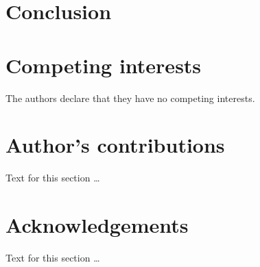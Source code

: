 \documentclass{bmcart}
\begin{document}

\section*{Conclusion}


\begin{backmatter}

\section*{Competing interests}
  The authors declare that they have no competing interests.

\section*{Author's contributions}
    Text for this section \ldots

\section*{Acknowledgements}
  Text for this section \ldots



\end{backmatter}
\end{document}
